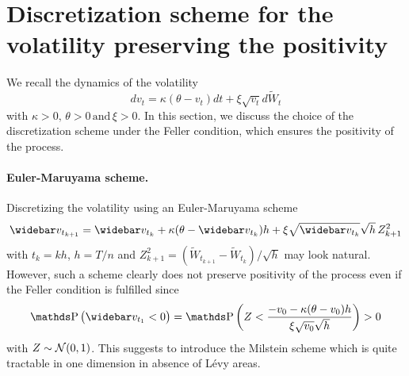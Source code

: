 

\section{Discretization scheme for the volatility preserving the positivity} \label{RH:appendix:discussionschememilstein}

We recall the dynamics of the volatility
\begin{equation*}
	dv_t = \kappa (\theta - v_t) dt + \xi \sqrt{v_t} d \widetilde W_t
\end{equation*}
with $\kappa >0,\, \theta >0 \,\mbox{and}\, \xi > 0$. In this section, we discuss the choice of the discretization scheme under the Feller condition, which ensures the positivity of the process.


\paragraph{Euler-Maruyama scheme.}
Discretizing the volatility using an Euler-Maruyama scheme
\begin{equation*}
	\widebar v_{t_{k+1}} = \widebar v_{t_k} + \kappa (\theta - \widebar v_{t_k}) h + \xi \sqrt{\widebar v_{t_k}} \sqrt{h} \, Z_{k+1}^2
\end{equation*}
with $t_k = k h$, $h = T/n$ and $Z_{k+1}^2 = (\widetilde W_{t_{k+1}} - \widetilde W_{t_k} ) / \sqrt{h} $ may look natural. However, such a scheme clearly does not preserve positivity of the process even if the Feller condition is fulfilled since
\begin{equation*}
	\Prob \big( \widebar v_{t_1} < 0 \big) = \Prob \bigg( Z < \frac{- v_{0} - \kappa (\theta - v_0) h}{\xi \sqrt{v_0} \sqrt{h} } \bigg) > 0
\end{equation*}
with $Z \sim \operatorname{\mathcal{N}} (0, 1)$. This suggests to introduce the Milstein scheme which is quite tractable in one dimension in absence of Lévy areas.

